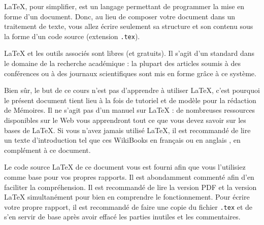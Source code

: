 \documentclass{ASD}
\begin{document}
\LaTeX{}, pour simplifier, est un langage permettant de programmer la mise en forme d'un document. Donc, au lieu de composer votre document dans un traitement de texte, vous allez écrire seulement sa structure et son contenu sous la forme d'un code source (extension \texttt{.tex}). 
	
\LaTeX{} et les outils associés sont libres (et gratuits). Il s'agit d'un standard dans le domaine de la recherche académique : la plupart des articles soumis à des conférences ou à des journaux scientifiques sont mis en forme gr\^ace à ce système.
	
Bien s\^ur, le but de ce cours n'est pas d'apprendre à utiliser \LaTeX{}, c'est pourquoi le présent document tient lieu à la fois de tutoriel et de modèle pour la rédaction de Mémoires. Il ne s'agit pas d'un manuel sur \LaTeX{} : de nombreuses ressources disponibles sur le Web vous apprendront tout ce que vous devez savoir sur les bases de \LaTeX{}. Si vous n'avez jamais utilisé \LaTeX{}, il est recommandé de lire un texte d'introduction tel que ces WikiBooks en français \cite{Wikibooks2010} ou en anglais \cite{Wikibooks2011}, en complément à ce document.
	
Le code source \LaTeX{} de ce document vous est fourni afin que vous l'utilisiez comme base pour vos propres rapports. Il est abondamment commenté afin d'en faciliter la compréhension. Il est recommandé de lire la version PDF et la version \LaTeX{} simultanément pour bien en comprendre le fonctionnement. Pour écrire votre propre rapport, il est recommandé de faire une copie du fichier \texttt{.tex} et de s'en servir de base après avoir effacé les parties inutiles et les commentaires.
	  
\end{document}

